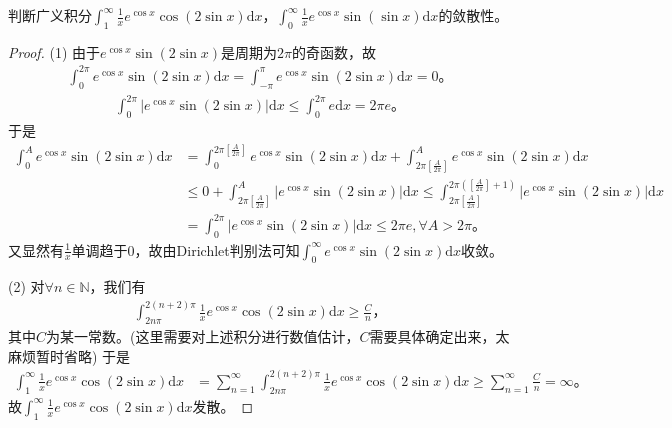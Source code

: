 \documentclass[../../main.tex]{subfiles}
\begin{document}
\begin{example}
判断广义积分\(\int_{1}^{\infty}\frac{1}{x}e^{\cos x}\cos(2\sin x)\mathrm{d}x\)，\(\int_{0}^{\infty}\frac{1}{x}e^{\cos x}\sin(\sin x)\mathrm{d}x\)的敛散性。 
\end{example}
\begin{proof}
(1) 由于\(e^{\cos x}\sin \left( 2\sin x \right)\)是周期为\(2\pi\)的奇函数，故
\begin{align*}
\int_0^{2\pi}{e^{\cos x}\sin \left( 2\sin x \right) \mathrm{d}x}=\int_{-\pi}^{\pi}{e^{\cos x}\sin \left( 2\sin x \right) \mathrm{d}x}=0。
\end{align*}
\begin{align*}
\int_0^{2\pi}{\left| e^{\cos x}\sin \left( 2\sin x \right) \right|\mathrm{d}x}\leqslant \int_0^{2\pi}{e\mathrm{d}x}=2\pi e。
\end{align*}
于是
\begin{align*}
\int_0^A{e^{\cos x}\sin \left( 2\sin x \right) \mathrm{d}x}&=\int_0^{2\pi \left[ \frac{A}{2\pi} \right]}{e^{\cos x}\sin \left( 2\sin x \right) \mathrm{d}x}+\int_{2\pi \left[ \frac{A}{2\pi} \right]}^A{e^{\cos x}\sin \left( 2\sin x \right) \mathrm{d}x} \\
&\leqslant 0+\int_{2\pi \left[ \frac{A}{2\pi} \right]}^A{\left| e^{\cos x}\sin \left( 2\sin x \right) \right|\mathrm{d}x} 
\leqslant \int_{2\pi \left[ \frac{A}{2\pi} \right]}^{2\pi \left( \left[ \frac{A}{2\pi} \right] +1 \right)}{\left| e^{\cos x}\sin \left( 2\sin x \right) \right|\mathrm{d}x} \\
&=\int_0^{2\pi}{\left| e^{\cos x}\sin \left( 2\sin x \right) \right|\mathrm{d}x}\leqslant 2\pi e,\forall A>2\pi。
\end{align*}
又显然有\(\frac{1}{x}\)单调趋于\(0\)，故由Dirichlet判别法可知\(\int_0^{\infty}{e^{\cos x}\sin \left( 2\sin x \right) \mathrm{d}x}\)收敛。

(2) 对\(\forall n\in \mathbb{N}\)，我们有
\begin{align*}
\int_{2n\pi}^{2\left( n+2 \right) \pi}{\frac{1}{x}e^{\cos x}\cos \left( 2\sin x \right) \mathrm{d}x}\geqslant \frac{C}{n}，
\end{align*}
其中\(C\)为某一常数。(这里需要对上述积分进行数值估计，\(C\)需要具体确定出来，太麻烦暂时省略) 于是
\begin{align*}
\int_1^{\infty}{\frac{1}{x}e^{\cos x}\cos(2\sin x)\mathrm{d}x}&=\sum_{n=1}^{\infty}{\int_{2n\pi}^{2\left( n+2 \right) \pi}{\frac{1}{x}e^{\cos x}\cos \left( 2\sin x \right) \mathrm{d}x}} 
\geqslant \sum_{n=1}^{\infty}{\frac{C}{n}}=\infty。
\end{align*}
故\(\int_1^{\infty}{\frac{1}{x}e^{\cos x}\cos(2\sin x)\mathrm{d}x}\)发散。
\end{proof}
\end{document}
